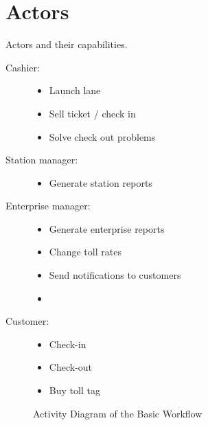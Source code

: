 \section{Actors}
Actors and their capabilities.
\begin{description}
\item [Cashier:]

\begin{itemize}
  \item Launch lane
  \item Sell ticket / check in
  \item Solve check out problems
\end{itemize}
\end{description}

\begin{description}
\item [Station manager:]

\begin{itemize}
  \item Generate station reports
\end{itemize}
\end{description}

\begin{description}
\item [Enterprise manager:]

\begin{itemize}
  \item Generate enterprise reports
  \item Change toll rates
  \item Send notifications to customers
  \item 
\end{itemize}
\end{description}

\begin{description}
\item [Customer:]

\begin{itemize}
  \item Check-in
  \item Check-out
  \item Buy toll tag
\end{itemize}
\end{description}


\begin{figure}

\caption{Activity Diagram of the Basic Workflow}
\end{figure}


